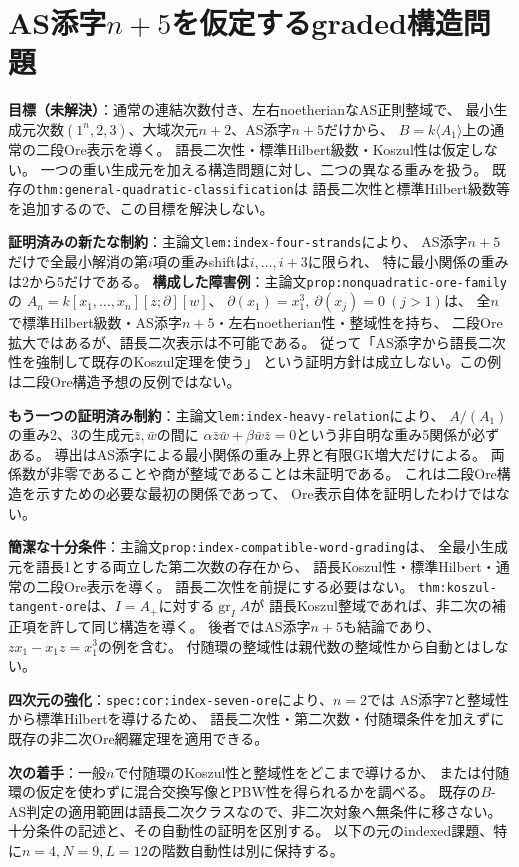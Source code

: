 \documentclass[11pt,a4paper]{ltjsarticle}
\begin{document}
\section{AS添字\texorpdfstring{$n+5$}{n+5}を仮定するgraded構造問題}
\textbf{目標（未解決）}：通常の連結次数付き、左右noetherianなAS正則整域で、
最小生成元次数$(1^n,2,3)$、大域次元$n+2$、AS添字$n+5$だけから、
$B=k\langle A_1\rangle$上の通常の二段Ore表示を導く。
語長二次性・標準Hilbert級数・Koszul性は仮定しない。
一つの重い生成元を加える構造問題に対し、二つの異なる重みを扱う。
既存の\texttt{thm:general-quadratic-classification}は
語長二次性と標準Hilbert級数等を追加するので、この目標を解決しない。

\textbf{証明済みの新たな制約}：主論文\texttt{lem:index-four-strands}により、
AS添字$n+5$だけで全最小解消の第$i$項の重みshiftは$i,\ldots,i+3$に限られ、
特に最小関係の重みは2から5だけである。
\textbf{構成した障害例}：主論文\texttt{prop:nonquadratic-ore-family}の
$A_n=k[x_1,\ldots,x_n][z;\partial][w]$、
$\partial(x_1)=x_1^3,\ \partial(x_j)=0\ (j>1)$は、
全$n$で標準Hilbert級数・AS添字$n+5$・左右noetherian性・整域性を持ち、
二段Ore拡大ではあるが、語長二次表示は不可能である。
従って「AS添字から語長二次性を強制して既存のKoszul定理を使う」
という証明方針は成立しない。この例は二段Ore構造予想の反例ではない。

\textbf{もう一つの証明済み制約}：主論文\texttt{lem:index-heavy-relation}により、
$A/(A_1)$の重み2、3の生成元$\bar z,\bar w$の間に
$\alpha\bar z\bar w+\beta\bar w\bar z=0$という非自明な重み5関係が必ずある。
導出はAS添字による最小関係の重み上界と有限GK増大だけによる。
両係数が非零であることや商が整域であることは未証明である。
これは二段Ore構造を示すための必要な最初の関係であって、
Ore表示自体を証明したわけではない。

\textbf{簡潔な十分条件}：主論文\texttt{prop:index-compatible-word-grading}は、
全最小生成元を語長1とする両立した第二次数の存在から、
語長Koszul性・標準Hilbert・通常の二段Ore表示を導く。
語長二次性を前提にする必要はない。
\texttt{thm:koszul-tangent-ore}は、$I=A_+$に対する$\operatorname{gr}_I A$が
語長Koszul整域であれば、非二次の補正項を許して同じ構造を導く。
後者ではAS添字$n+5$も結論であり、$zx_1-x_1z=x_1^3$の例を含む。
付随環の整域性は親代数の整域性から自動とはしない。

\textbf{四次元の強化}：\texttt{spec:cor:index-seven-ore}により、$n=2$では
AS添字7と整域性から標準Hilbertを導けるため、
語長二次性・第二次数・付随環条件を加えずに既存の非二次Ore網羅定理を適用できる。

\textbf{次の着手}：一般$n$で付随環のKoszul性と整域性をどこまで導けるか、
または付随環の仮定を使わずに混合交換写像とPBW性を得られるかを調べる。
既存の$B$-AS判定の適用範囲は語長二次クラスなので、非二次対象へ無条件に移さない。
十分条件の記述と、その自動性の証明を区別する。
以下の元のindexed課題、特に$n=4,N=9,L=12$の階数自動性は別に保持する。
\end{document}
